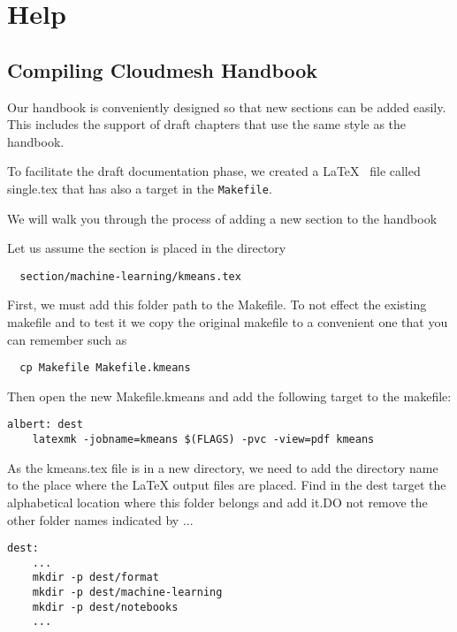 \chapter{Help}

\section{Compiling Cloudmesh Handbook}\label{s:help-compile-handbook}

Our handbook is conveniently designed so that new sections can be
added easily. This includes the support of draft chapters that use the
same style as the handbook.

To facilitate the draft documentation phase, we created a \LaTeX~ file
called single.tex that has also a target in the \verb|Makefile|.

We will walk you through the process of adding a new section to the handbook

Let us assume the section is placed in the directory

\begin{lstlisting}
  section/machine-learning/kmeans.tex 
\end{lstlisting}

First, we must add this folder path to the Makefile. To not effect the
existing makefile and to test it we copy the original makefile to a
convenient one that you can remember such as

\begin{lstlisting}
  cp Makefile Makefile.kmeans
\end{lstlisting}

Then open the new Makefile.kmeans and add the following target to the
makefile:

\begin{lstlisting}
albert: dest 
	latexmk -jobname=kmeans $(FLAGS) -pvc -view=pdf kmeans
\end{lstlisting}  

As the kmeans.tex file is in a new directory, we need to add the
directory name to the place where the LaTeX output files are placed.
Find in the dest target the alphabetical location where  this folder
belongs and add it.DO not remove the other folder names indicated by
...


\begin{lstlisting}
dest:
    ...
    mkdir -p dest/format
    mkdir -p dest/machine-learning
    mkdir -p dest/notebooks
    ...
\end{lstlisting}


